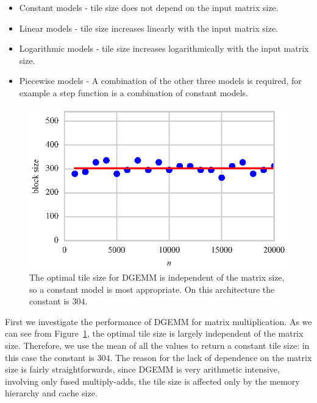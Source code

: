 \documentclass[a4paper,12pt]{article}
\begin{document}
\begin{itemize}
\item Constant models - tile size does not depend on the input matrix size.
\item Linear models - tile size increases linearly with the input matrix size.
\item Logarithmic models - tile size increases logarithmically with the
  input matrix size.
\item Piecewise models - A combination of the other three models is required,
  for example a step function is a combination of constant models.
\end{itemize}

\begin{figure}[ht]
  \centering
  \includegraphics[scale=1]{fig/curvefit_const.eps}
  \caption{The optimal tile size for DGEMM is independent of the
    matrix size, so a constant model is most appropriate.
    On this architecture the constant is $304$.}
  \label{fig.fit_const}
\end{figure}
First we investigate the performance of DGEMM
for matrix multiplication.
As we can see from Figure~\ref{fig.fit_const},
the optimal tile size is largely independent of the matrix size.
Therefore, we use the mean of all the values to return a constant
tile size:
in this case the constant is $304$.
The reason for the lack of dependence on the matrix size is
fairly straightforwards,
since DGEMM is very arithmetic intensive,
involving only fused multiply-adds,
the tile size is affected only by the memory hierarchy
and cache size.
\end{document}
